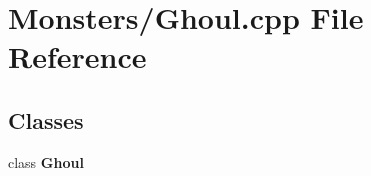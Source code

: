 \section{Monsters/\-Ghoul.cpp File Reference}
\label{_ghoul_8cpp}
\subsection*{Classes}
\begin{DoxyCompactItemize}
\item 
class {\bf Ghoul}
\end{DoxyCompactItemize}
